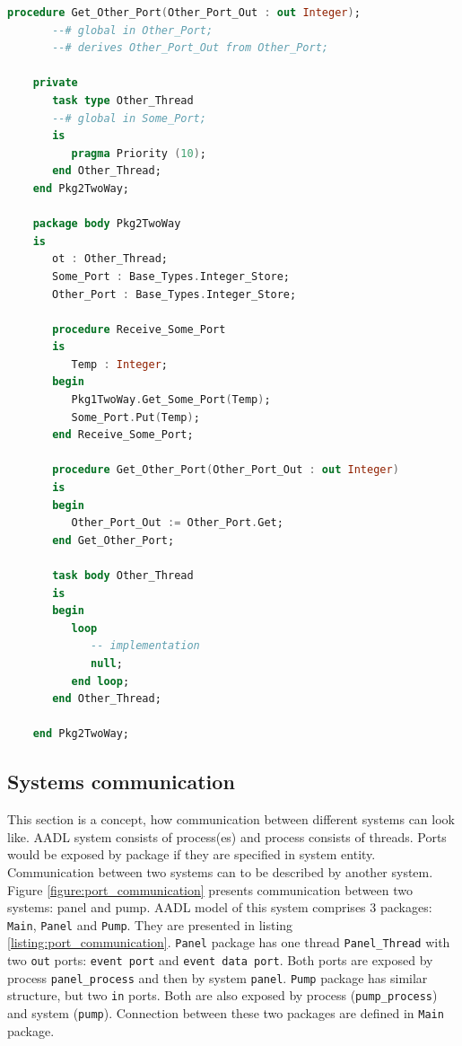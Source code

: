 \begin{lstlisting}[language=ada, frame=single, gobble=0, caption={Two way port communication translated to SPARK Ada}, label={listing:port_communication_thread_two_way_spark}]
	   procedure Get_Other_Port(Other_Port_Out : out Integer);
	   --# global in Other_Port;
	   --# derives Other_Port_Out from Other_Port;

	private
	   task type Other_Thread
	   --# global in Some_Port;
	   is
	      pragma Priority (10);
	   end Other_Thread;
	end Pkg2TwoWay;

	package body Pkg2TwoWay
	is
	   ot : Other_Thread;
	   Some_Port : Base_Types.Integer_Store;
	   Other_Port : Base_Types.Integer_Store;
	   
	   procedure Receive_Some_Port
	   is
	      Temp : Integer;
	   begin
	      Pkg1TwoWay.Get_Some_Port(Temp);
	      Some_Port.Put(Temp);
	   end Receive_Some_Port;   
	   
	   procedure Get_Other_Port(Other_Port_Out : out Integer)
	   is
	   begin
	      Other_Port_Out := Other_Port.Get;
	   end Get_Other_Port;
	   
	   task body Other_Thread
	   is   
	   begin      
	      loop         
	         -- implementation
	         null;         
	      end loop;      
	   end Other_Thread;

	end Pkg2TwoWay;
\end{lstlisting} 
\doublespacing


\subsection{Systems communication}
\label{codegen:port_communication:system}

This section is a concept, how communication between different systems can look like. AADL system consists of process(es) and process consists of threads. Ports would be exposed by package if they are specified in system entity. Communication between two systems can to be described by another system. Figure \ref{figure:port_communication} presents communication between two systems: panel and pump. AADL model of this system comprises 3 packages: \lstinline{Main}, \lstinline{Panel} and \lstinline{Pump}. They are presented in listing \ref{listing:port_communication}. \lstinline{Panel} package has one thread \lstinline{Panel_Thread} with two \lstinline{out} ports: \lstinline{event port} and \lstinline{event data port}. Both ports are exposed by process \lstinline{panel_process} and then by system \lstinline{panel}. \lstinline{Pump} package has similar structure, but two \lstinline{in} ports. Both are also exposed by process (\lstinline{pump_process}) and system (\lstinline{pump}). Connection between these two packages are defined in \lstinline{Main} package.

